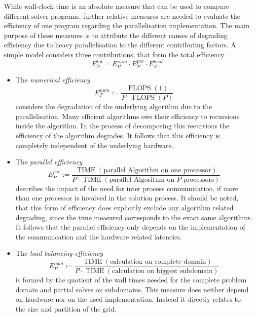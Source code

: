 While wall-clock time is an absolute measure that can be used to compare different solver programs, further relative measures are needed to evaluate the efficiency of one program regarding the parallelisation implementation. The main purpose of these measures is to attribute the different causes of degrading efficiency due to heavy parallelisation to the different contributing factors. A simple model \cite{ferziger02,schaefer99} considers three contributions, that form the total efficiency
\begin{displaymath}
  E^{tot}_P = E^{num}_P \cdot E^{par}_P \cdot E^{load}_P.
\end{displaymath}
\begin{itemize}
  \item[] The \emph{numerical efficiency}
  \begin{displaymath} E^{num}_P := \frac{\operatorname{FLOPS}(1)}{P \cdot \operatorname{FLOPS}(P)}\end{displaymath} 
    considers the degradation of the underlying algorithm due to the parallelisation. Many efficient algorithms owe their efficiency to recursions inside the algorithm. In the process of decomposing this recursions the efficiency of the algorithm degrades. It follows that this efficiency is completely independent of the underlying hardware.
  \item[] The \emph{parallel efficiency}
    \begin{displaymath} E^{par}_P :=\frac{\operatorname{TIME}(\text{parallel Algorithm on one processor})}{P \cdot \operatorname{TIME}(\text{parallel Algorithm on \(P\) processors})} \end{displaymath} 
      describes the impact of the need for inter process communication, if more than one processor is involved in the solution process. It should be noted, that this form of efficiency does explicitly exclude any algorithm related degrading, since the time measured corresponds to the exact same algorithms. It follows that the parallel efficiency only depends on the implementation of the communication and the hardware related latencies.
  \item[] The \emph{load balancing efficiency} 
    \begin{displaymath} E^{load}_P :=\frac{\operatorname{TIME}(\text{calculation on complete domain})}{P \cdot \operatorname{TIME}(\text{calculation on biggest subdomain})} \end{displaymath}
       is formed by the quotient of the wall times needed for the complete problem domain and partial solves on subdomains. This measure does neither depend on hardware nor on the used implementation. Instead it directly relates to the size and partition of the grid. 
\end{itemize}

